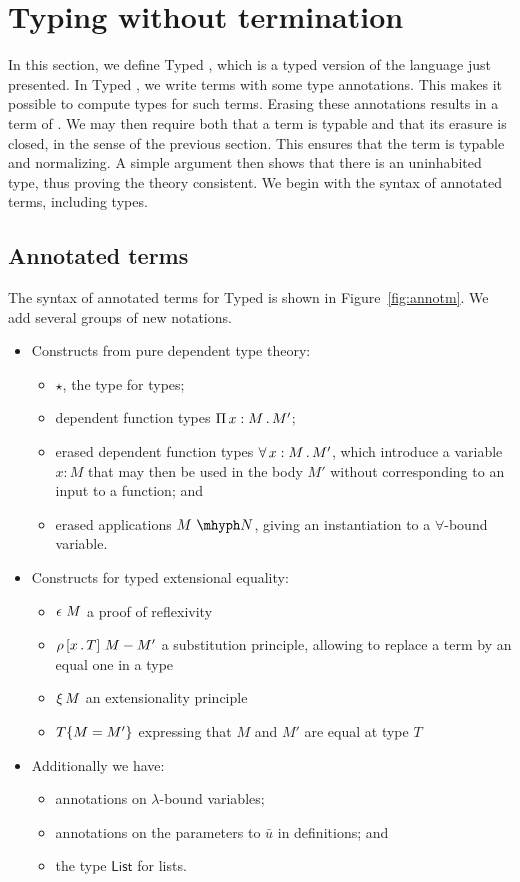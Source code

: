 \documentclass{article}
\begin{document}
\section{Typing without termination}

In this section, we define Typed \sar, which is a typed version of the
\sar language just presented.  In Typed \sar, we write terms with some
type annotations.  This makes it possible to compute types for such
terms.  Erasing these annotations results in a term of \sar.  We may
then require both that a term is typable and that its erasure is
closed, in the sense of the previous section.  This ensures that the
term is typable and normalizing.  A simple argument then shows that
there is an uninhabited type, thus proving the theory consistent.  We
begin with the syntax of annotated terms, including types.

\subsection{Annotated terms}

The syntax of annotated terms for Typed \sar is shown in
Figure~\ref{fig:annotm}.  We add several groups of new notations.
\begin{itemize}
\item Constructs from pure dependent type theory:
  \begin{itemize}
  \item $\star$, the type for types;
  \item dependent function types $\Pia{x}{M}{M'}$;
  \item erased dependent function types $\allt{x}{M}{M'}$, which introduce a variable $x:M$ that
    may then be used in the body $M'$ without corresponding to an input to a function; and
  \item erased applications $\appe{M}{N}$, giving an instantiation to a $\forall$-bound variable.
  \end{itemize}
\item Constructs for typed extensional equality:
  \begin{itemize}
  \item $\rfl{M}$ a proof of reflexivity
  \item $\cng{x}{T}{M}{M'}$ a substitution principle, allowing to replace a term by an equal one in a type
  \item $\ext{M}$ an extensionality principle
  \item $\eqtm{M}{T}{M'}$ expressing that $M$ and $M'$ are equal at type $T$
  \end{itemize}
\item Additionally we have:
\begin{itemize}
\item annotations on $\lambda$-bound variables;
\item annotations on the parameters to $\bar{u}$ in definitions; and
\item the type $\mathsf{List}$ for lists.
\end{itemize}
\end{itemize}
\end{document}
